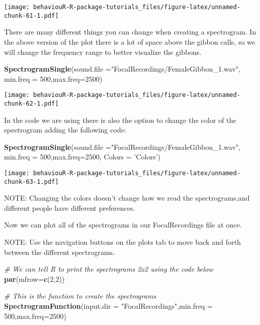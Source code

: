 \documentclass[]{book}
\newenvironment{Shaded}{\begin{snugshade}}{\end{snugshade}}
\newcommand{\CommentTok}[1]{\textcolor[rgb]{0.56,0.35,0.01}{\textit{#1}}}
\newcommand{\DataTypeTok}[1]{\textcolor[rgb]{0.13,0.29,0.53}{#1}}
\newcommand{\DecValTok}[1]{\textcolor[rgb]{0.00,0.00,0.81}{#1}}
\newcommand{\KeywordTok}[1]{\textcolor[rgb]{0.13,0.29,0.53}{\textbf{#1}}}
\newcommand{\NormalTok}[1]{#1}
\newcommand{\StringTok}[1]{\textcolor[rgb]{0.31,0.60,0.02}{#1}}
\begin{document}
\texttt{[image: behaviouR-R-package-tutorials\_files/figure-latex/unnamed-chunk-61-1.pdf]}

There are many different things you can change when creating a spectrogram. In the above version of the plot there is a lot of space above the gibbon calls, so we will change the frequency range to better visualize the gibbons.

\begin{Shaded}
\begin{Highlighting}[]
\KeywordTok{SpectrogramSingle}\NormalTok{(}\DataTypeTok{sound.file =}\StringTok{"FocalRecordings/FemaleGibbon_1.wav"}\NormalTok{,}
                  \DataTypeTok{min.freq =} \DecValTok{500}\NormalTok{,}\DataTypeTok{max.freq=}\DecValTok{2500}\NormalTok{)}
\end{Highlighting}
\end{Shaded}

\texttt{[image: behaviouR-R-package-tutorials\_files/figure-latex/unnamed-chunk-62-1.pdf]}

In the code we are using there is also the option to change the color of the spectrogram adding the following code:

\begin{Shaded}
\begin{Highlighting}[]
\KeywordTok{SpectrogramSingle}\NormalTok{(}\DataTypeTok{sound.file =}\StringTok{"FocalRecordings/FemaleGibbon_1.wav"}\NormalTok{,}
                  \DataTypeTok{min.freq =} \DecValTok{500}\NormalTok{,}\DataTypeTok{max.freq=}\DecValTok{2500}\NormalTok{,}
                  \DataTypeTok{Colors =} \StringTok{'Colors'}\NormalTok{)}
\end{Highlighting}
\end{Shaded}

\texttt{[image: behaviouR-R-package-tutorials\_files/figure-latex/unnamed-chunk-63-1.pdf]}

NOTE: Changing the colors doesn't change how we read the spectrograms,and different people have different preferences.

Now we can plot all of the spectrograms in our FocalRecordings file at once.

NOTE: Use the navigation buttons on the plots tab to move back and forth between the different spectrograms.

\begin{Shaded}
\begin{Highlighting}[]
\CommentTok{# We can tell R to print the spectrograms 2x2 using the code below}
\KeywordTok{par}\NormalTok{(}\DataTypeTok{mfrow=}\KeywordTok{c}\NormalTok{(}\DecValTok{2}\NormalTok{,}\DecValTok{2}\NormalTok{))}

\CommentTok{# This is the function to create the spectrograms}
  \KeywordTok{SpectrogramFunction}\NormalTok{(}\DataTypeTok{input.dir =} \StringTok{"FocalRecordings"}\NormalTok{,}\DataTypeTok{min.freq =} \DecValTok{500}\NormalTok{,}\DataTypeTok{max.freq=}\DecValTok{2500}\NormalTok{)}
\end{Highlighting}
\end{Shaded}
\end{document}
